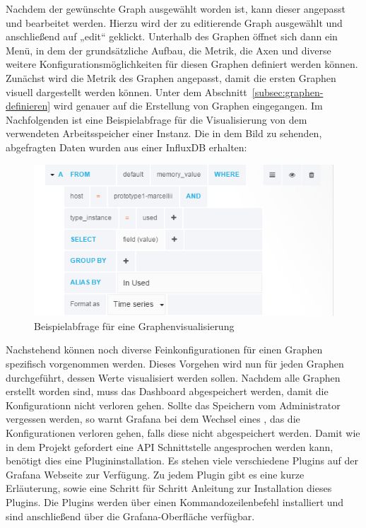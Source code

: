 Nachdem der gewünschte Graph ausgewählt worden ist, kann dieser angepasst und
bearbeitet werden. Hierzu wird der zu editierende Graph ausgewählt und
anschließend auf „edit“ geklickt. Unterhalb des Graphen öffnet sich dann ein
Menü, in dem der grundsätzliche Aufbau, die Metrik, die Axen und diverse
weitere Konfigurationsmöglichkeiten für diesen Graphen definiert werden können.
Zunächst wird die Metrik des Graphen angepasst, damit die ersten Graphen
visuell dargestellt werden können. Unter dem
Abschnitt~\ref{subsec:graphen-definieren} wird genauer auf die Erstellung von
Graphen eingegangen. Im Nachfolgenden ist eine Beispielabfrage für die
Visualisierung von dem verwendeten Arbeitsspeicher einer Instanz. Die in dem
Bild zu sehenden, abgefragten Daten wurden aus einer InfluxDB erhalten:

\begin{figure}[H]
  \centering
  \includegraphics[width=1.0\textwidth]{../figures/graph.png}
  \caption{Beispielabfrage für eine Graphenvisualisierung}
\label{figure:graph}
\end{figure}

Nachstehend können noch diverse Feinkonfigurationen für einen Graphen
spezifisch vorgenommen werden. Dieses Vorgehen wird nun für jeden Graphen
durchgeführt, dessen Werte visualisiert werden sollen. Nachdem alle Graphen
erstellt worden sind, muss das \gls{Dashboard} abgespeichert werden, damit die
Konfigurationn nicht verloren gehen. Sollte das Speichern vom Administrator
vergessen werden, so warnt Grafana bei dem Wechsel eines
, das die Konfigurationen verloren gehen, falls
diese nicht abgespeichert werden. Damit wie in dem Projekt gefordert eine
\gls{API} Schnittstelle angesprochen werden kann, benötigt dies eine
Plugininstallation. Es stehen viele verschiedene Plugins auf der Grafana
Webseite zur Verfügung. Zu jedem Plugin gibt es eine kurze Erläuterung, sowie
eine Schritt für Schritt Anleitung zur Installation dieses Plugins. Die Plugins
werden über einen Kommandozeilenbefehl installiert und sind anschließend über
die Grafana\hyp{}Oberfläche verfügbar.

